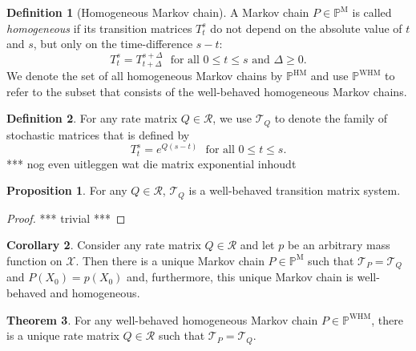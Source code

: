 \documentclass[10pt]{paper}
\theoremstyle{definition}
\newtheorem{theorem}{Theorem}
\newtheorem{proposition}[theorem]{Proposition}
\newtheorem{corollary}[theorem]{Corollary}
\newtheorem{definition}{Definition}
\newcommand{\states}{\mathcal{X}}
\newcommand{\processes}{\mathbb{P}}
\newcommand{\mprocesses}{\processes^{\mathrm{M}}}
\newcommand{\hmprocesses}{\processes^{\mathrm{HM}}}
\newcommand{\whmprocesses}{\processes^{\mathrm{WHM}}}
\begin{document}
\begin{definition}[Homogeneous Markov chain]\label{def:homogeneousMarkov}
A Markov chain $P\in\mprocesses$ is called \emph{homogeneous} if its transition matrices $T_t^s$ do not depend on the absolute value of $t$ and $s$, but only on the time-difference $s-t$:
\begin{equation}\label{eq:homogeneousMarkov}
T_t^s=T_{t+\Delta}^{s+\Delta}
\text{~~for all $0\leq t\leq s$ and $\Delta\geq0$.}
\end{equation}
We denote the set of all homogeneous Markov chains by $\hmprocesses$ and use $\whmprocesses$ to refer to the subset that consists of the well-behaved homogeneous Markov chains.
\end{definition}


\begin{definition}\label{def:systemfromQ}For any rate matrix $Q\in\mathcal{R}$, we use $\mathcal{T}_Q$ to denote the family of stochastic matrices that is defined by
\begin{equation*}
T_t^s=e^{Q(s-t)}
\text{~~for all $0\leq t\leq s$.}
\end{equation*}
*** nog even uitleggen wat die matrix exponential inhoudt
\end{definition}

\begin{proposition}
\label{prop:systemQ}
For any $Q\in\mathcal{R}$, $\mathcal{T}_Q$ is a well-behaved transition matrix system.
\end{proposition}
\begin{proof}
*** trivial ***
\end{proof}

\begin{corollary}\label{cor:rate_has_unique_homogen_markov_process}
Consider any rate matrix $Q\in\mathcal{R}$ and let $p$ be an arbitrary mass function on $\states$. Then there is a unique Markov chain $P\in\mprocesses$ such that $\mathcal{T}_P=\mathcal{T}_Q$ and $P(X_0)=p(X_0)$ and, furthermore, this unique Markov chain is well-behaved and homogeneous.
\end{corollary}


\begin{theorem}\label{theo:homogeneoushasQ}
For any well-behaved homogeneous Markov chain $P\in\whmprocesses$, there is a unique rate matrix $Q\in\mathcal{R}$ such that $\mathcal{T}_P=\mathcal{T}_Q$.
\end{theorem}
\end{document}

